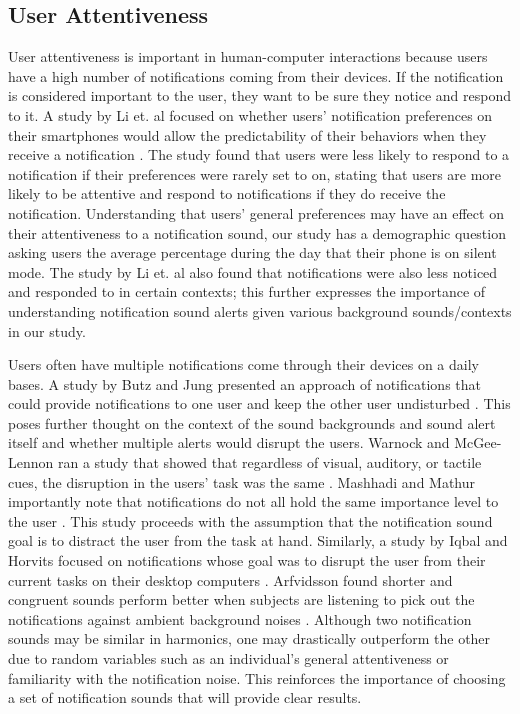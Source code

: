 \documentclass[manuscript,screen,review]{acmart}
\begin{document}
\subsection{User Attentiveness}
User attentiveness is important in human-computer interactions because users have a high number of notifications coming from their devices.
If the notification is considered important to the user, they want to be sure they notice and respond to it. A study by Li et. al focused on whether users' notification preferences on their smartphones would allow the predictability of their behaviors when they receive a notification \cite{10.1145/3478868}. The study found that users were less likely to respond to a notification if their preferences were rarely set to on, stating that users are more likely to be attentive and respond to notifications if they do receive the notification. Understanding that users' general preferences may have an effect on their attentiveness to a notification sound, our study has a demographic question asking users the average percentage during the day that their phone is on silent mode. The study by Li et. al also found that notifications were also less noticed and responded to in certain contexts; this further expresses the importance of understanding notification sound alerts given various background sounds/contexts in our study.

Users often have multiple notifications come through their devices on a daily bases. A study by Butz and Jung presented an approach of notifications that could provide notifications to one user and keep the other user undisturbed \cite{1040830.1040914}. This poses further thought on the context of the sound backgrounds and sound alert itself and whether multiple alerts would disrupt the users. Warnock and McGee-Lennon ran a study that showed that regardless of visual, auditory, or tactile cues, the disruption in the users' task was the same \cite{10.5555/2042118.2042173}. Mashhadi and Mathur importantly note that notifications do not all hold the same importance level to the user \cite{10.1145/2638728.2638759}. This study proceeds with the assumption that the notification sound goal is to distract the user from the task at hand. Similarly, a study by Iqbal and Horvits focused on notifications whose goal was to disrupt the user from their current tasks on their desktop computers \cite{10.1145/1718918.1718926}. Arfvidsson found shorter and congruent sounds perform better when subjects are listening to pick out the notifications against ambient background noises \cite{Arfvidsson21}. Although two notification sounds may be similar in harmonics, one may drastically outperform the other due to random variables such as an individual's general attentiveness or familiarity with the notification noise. This reinforces the importance of choosing a set of notification sounds that will provide clear results.
\end{document}
